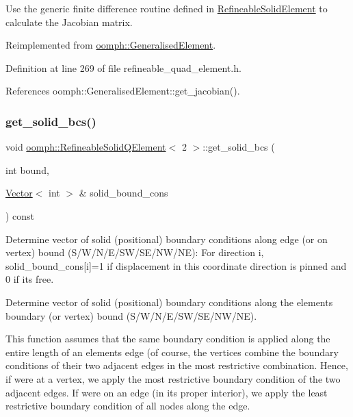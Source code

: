 Use the generic finite difference routine defined in \hyperlink{classoomph_1_1RefineableSolidElement}{Refineable\+Solid\+Element} to calculate the Jacobian matrix. 



Reimplemented from \hyperlink{classoomph_1_1GeneralisedElement_ab915bdad7e6643e5e73a6d98bc7cf48e}{oomph\+::\+Generalised\+Element}.



Definition at line 269 of file refineable\+\_\+quad\+\_\+element.\+h.



References oomph\+::\+Generalised\+Element\+::get\+\_\+jacobian().

\mbox{\label{classoomph_1_1RefineableSolidQElement_3_012_01_4_a5a06e687e147c9416ad56c166e55d27b}} 
\subsubsection{\texorpdfstring{get\+\_\+solid\+\_\+bcs()}{get\_solid\_bcs()}}
{\footnotesize\ttfamily void \hyperlink{classoomph_1_1RefineableSolidQElement}{oomph\+::\+Refineable\+Solid\+Q\+Element}$<$ 2 $>$\+::get\+\_\+solid\+\_\+bcs (\begin{DoxyParamCaption}\item[{int}]{bound,  }\item[{\hyperlink{classoomph_1_1Vector}{Vector}$<$ int $>$ \&}]{solid\+\_\+bound\+\_\+cons }\end{DoxyParamCaption}) const}



Determine vector of solid (positional) boundary conditions along edge (or on vertex) bound (S/\+W/\+N/\+E/\+S\+W/\+S\+E/\+N\+W/\+NE)\+: For direction i, solid\+\_\+bound\+\_\+cons\mbox{[}i\mbox{]}=1 if displacement in this coordinate direction is pinned and 0 if it\textquotesingle{}s free. 

Determine vector of solid (positional) boundary conditions along the element\textquotesingle{}s boundary (or vertex) bound (S/\+W/\+N/\+E/\+S\+W/\+S\+E/\+N\+W/\+NE).

This function assumes that the same boundary condition is applied along the entire length of an element\textquotesingle{}s edge (of course, the vertices combine the boundary conditions of their two adjacent edges in the most restrictive combination. Hence, if we\textquotesingle{}re at a vertex, we apply the most restrictive boundary condition of the two adjacent edges. If we\textquotesingle{}re on an edge (in its proper interior), we apply the least restrictive boundary condition of all nodes along the edge.

